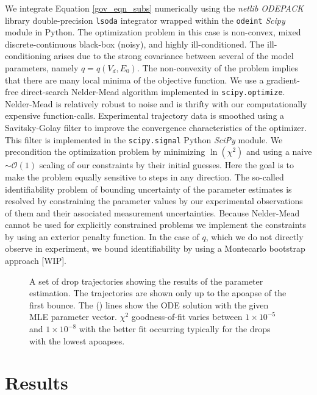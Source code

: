 \documentclass[aip,reprint, floatfix]{revtex4-1}
\begin{document}
We integrate Equation \ref{gov_eqn_subs} numerically using the \emph{netlib ODEPACK} library double-precision \verb|lsoda| integrator wrapped within the \verb|odeint| \emph{Scipy} \cite{oliphant_python_2007} module in Python. The optimization problem in this case is non-convex, mixed discrete-continuous black-box (noisy), and highly ill-conditioned. The ill-conditioning arises due to the strong covariance between several of the model parameters, namely $q=q(V_d, E_0)$. The non-convexity of the problem implies that there are many local minima of the objective function. We use a gradient-free direct-search Nelder-Mead \cite{nelder_simplex_1965} algorithm implemented in \verb|scipy.optimize|. Nelder-Mead is relatively robust to noise and is thrifty with our computationally expensive function-calls. Experimental trajectory data is smoothed using a Savitsky-Golay filter \cite{savitzky_smoothing_1964} to improve the convergence characteristics of the optimizer. This filter is implemented in the \verb|scipy.signal| Python \emph{SciPy} module. We precondition the optimization problem by minimizing $\ln(\chi^2)$ and using a naive $\sim \mathcal{O}(1)$ scaling of our constraints by their initial guesses. Here the goal is to make the problem equally sensitive to steps in any direction. The so-called identifiability problem of bounding uncertainty of the parameter estimates is resolved by constraining the parameter values by our experimental observations of them and their associated measurement uncertainties. Because Nelder-Mead cannot be used for explicitly constrained problems we implement the constraints by using an exterior penalty function. In the case of $q$, which we do not directly observe in experiment, we bound identifiability by using a Montecarlo bootstrap approach [WIP].

\begin{figure}[h]
    \centering
    \resizebox{0.5\textwidth}{!}{}
    \caption{A set of drop trajectories showing the results of the parameter estimation. The trajectories are shown only up to the apoapse of the first bounce. The (\protect\redline) \hspace{0.25 mm} lines show the ODE solution with the given MLE parameter vector. $\chi^2$ goodness-of-fit varies between $1 \times 10^{-5}$ and $1 \times 10^{-8}$ with the better fit occurring typically for the drops with the lowest apoapses.}
    \label{fig:inverse_problem}
\end{figure}

\section{Results}
\end{document}
